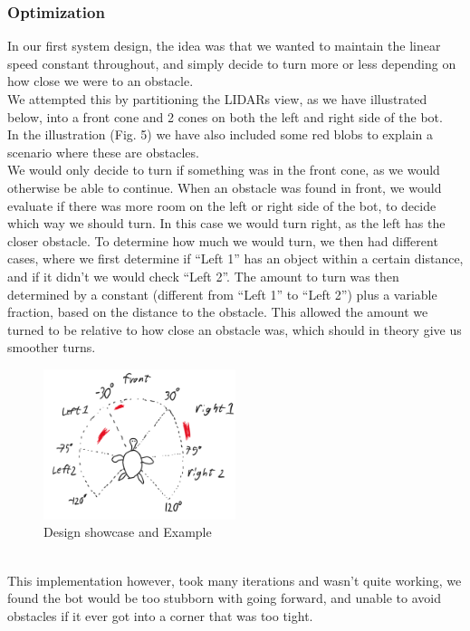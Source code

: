 \documentclass[conference]{IEEEtran}
\begin{document}
\subsubsection{Optimization}\label{opti}
In our first system design, the idea was that we wanted to maintain the linear speed constant throughout, and simply 
decide to turn more or less depending on how close we were to an obstacle. \\
We attempted this by partitioning the LIDARs view, as we have illustrated below, into a front cone and 2 cones on both 
the left and right side of the bot.\\
In the illustration (Fig. 5) we have also included some red blobs to explain a scenario where these are obstacles. \\
We would only decide to turn if something was in the front cone, as we would otherwise be able to continue. 
When an obstacle was found in front, we would evaluate if there was more room on the left or right side of the bot, 
to decide which way we should turn. In this case we would turn right, as the left has the closer obstacle. 
To determine how much we would turn, we then had different cases, where we first determine if “Left 1” has an 
object within a certain distance, and if it didn't we would check “Left 2”. The amount to turn was then determined 
by a constant (different from “Left 1” to “Left 2”) plus a variable fraction, based on the distance to the obstacle. 
This allowed the amount we turned to be relative to how close an obstacle was, which should in theory give us smoother turns. \\
\begin{figure}[h] %
    \centering
    \includegraphics[width=0.5\textwidth]{turtleExample.png}
    \caption{Design showcase and Example}
\end{figure} \\
This implementation however, took many iterations and wasn't quite working, we found the bot would be too stubborn with 
going forward, and unable to avoid obstacles if it ever got into a corner that was too tight. 
\end{document}
